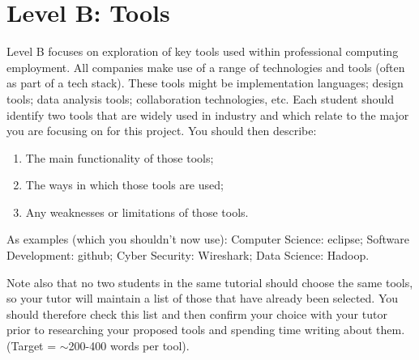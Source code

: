 \documentclass[a4paper, 11pt]{report}
\begin{document}

\newpage
\section{Level B: Tools}

Level B focuses on exploration of key tools used within professional computing employment. All companies make use of a range of technologies and tools (often as part of a tech stack). These tools might be implementation languages; design tools; data analysis tools; collaboration technologies, etc. Each student should identify two tools that are widely used in industry and which relate to the major you are focusing on for this project. You should then describe:
\begin{enumerate}
	\item The main functionality of those tools;
	\item The ways in which those tools are used;
	\item Any weaknesses or limitations of those tools.
\end{enumerate}

As examples (which you shouldn't now use): Computer Science: eclipse; Software Development: github; Cyber Security: Wireshark; Data Science: Hadoop.

Note also that no two students in the same tutorial should choose the same tools, so your tutor will maintain a list of those that have already been selected. You should therefore check this list and then confirm your choice with your tutor prior to researching your proposed tools and spending time writing about them. (Target = $\sim$200-400 words per tool).
\end{document}
